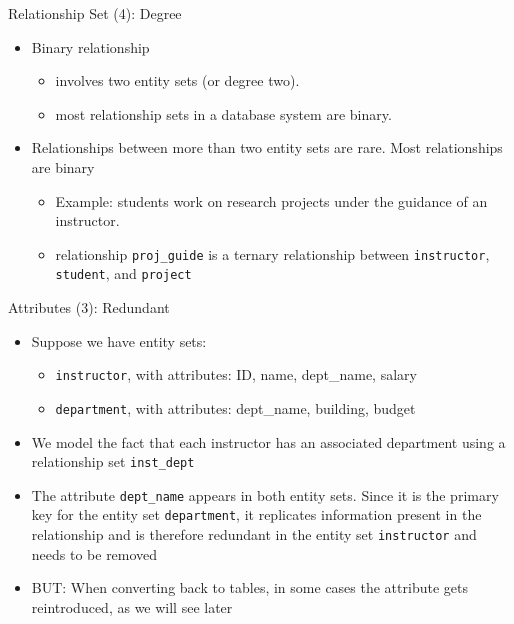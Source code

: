 \documentclass[aspectratio=169, xcolor=dvipsnames]{beamer}
\begin{document}
\begin{frame}{Relationship Set (4): Degree}
    \begin{itemize}[<+->]
        \item Binary relationship
        \begin{itemize}
            \item[$\triangleright$] involves two entity sets (or degree two).
            \item[$\triangleright$] most relationship sets in a database system are binary.
        \end{itemize}
        \item Relationships between more than two entity sets are rare. Most relationships are binary
        \begin{itemize}
            \item[$\triangleright$] Example: students work on research projects under the guidance of an instructor.
            \item[$\triangleright$] relationship \texttt{proj\_guide} is a ternary relationship between \texttt{instructor}, \texttt{student}, and \texttt{project}
        \end{itemize}
    \end{itemize}
\end{frame}

\begin{frame}{Attributes (3): Redundant}
    \begin{itemize}[<+->]
        \item Suppose we have entity sets:
        \begin{itemize}
            \item[$\triangleright$] \texttt{instructor}, with attributes: ID, name, dept\_name, salary
            \item[$\triangleright$] \texttt{department}, with attributes: dept\_name, building, budget
        \end{itemize}
        \item We model the fact that each instructor has an associated department using a relationship set \texttt{inst\_dept}
        \item The attribute \texttt{dept\_name} appears in both entity sets. Since it is the primary key for the entity set \texttt{department}, it replicates information present in the relationship and is therefore redundant in the entity set \texttt{instructor} and needs to be removed
        \item BUT: When converting back to tables, in some cases the attribute gets reintroduced, as we will see later
    \end{itemize}
\end{frame}
\end{document}
